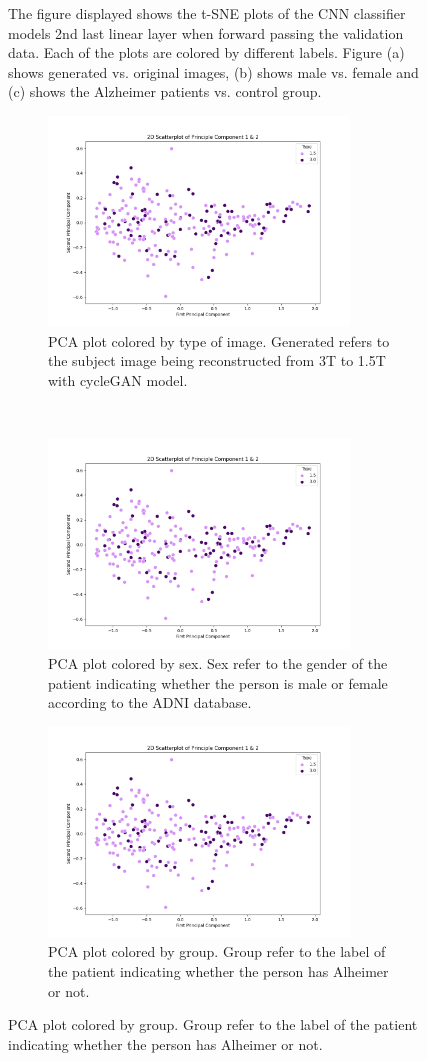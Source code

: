 \documentclass[12pt, fleqn, titlepage]{article}
\newcommand{\1}[1]{\mathds{1}\left[#1\right]}
\begin{document}
\begin{figure}[H]
	\caption{The figure displayed shows the t-SNE plots of the CNN classifier models 2nd last linear layer when forward passing the validation data. Each of the plots are colored by different labels. Figure (a) shows generated vs. original images, (b) shows male vs. female and (c) shows the Alzheimer patients vs. control group. }
		\label{fig:tsne_not_gen}
\end{figure}


\begin{figure}[H]
	\centering
	\begin{subfigure}[t]{0.59\textwidth}
		\centering
		\includegraphics[height=2.2in]{imgs/classifier/not_generated_imgs_pca_type}%
		\caption{PCA plot colored by type of image. Generated refers to the subject image being reconstructed from 3T to 1.5T with cycleGAN model.}
	\end{subfigure}%
	~
	\begin{subfigure}[t]{0.5\textwidth}
		\centering
		\includegraphics[height=2.2in]{imgs/classifier/not_generated_imgs_pca_sex}%
		\caption{PCA plot colored by sex. Sex refer to the gender of the patient indicating whether the person is male or female according to the ADNI database.}	
	\end{subfigure}
	\begin{subfigure}[t]{0.5\textwidth}
		\centering
		\includegraphics[height=2.2in]{imgs/classifier/not_generated_imgs_pca_group}%
		\caption{PCA plot colored by group. Group refer to the label of the patient indicating whether the person has Alheimer or not.}
	\end{subfigure}


\end{figure}
\end{document}
